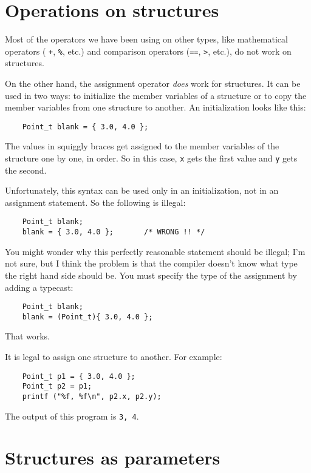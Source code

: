\section{Operations on structures}

Most of the operators we have been using on other types, like
mathematical operators ( {\tt +}, {\tt \%}, etc.) and comparison
operators ({\tt ==}, {\tt >}, etc.), do not work on structures.

On the other hand, the assignment operator {\em does} work for
structures.  It can be used in two ways: to initialize the member
variables of a structure or to copy the member variables from one
structure to another.  An initialization looks like this:

\begin{verbatim}
	Point_t blank = { 3.0, 4.0 };
\end{verbatim}
%
The values in squiggly braces get assigned to the member variables of
the structure one by one, in order.  So in this case, {\tt x}
gets the first value and {\tt y} gets the second.

Unfortunately, this syntax can be used only in an initialization,
not in an assignment statement.  So the following is illegal:

\begin{verbatim}
	Point_t blank;
	blank = { 3.0, 4.0 };       /* WRONG !! */
\end{verbatim}
%
You might wonder why this perfectly reasonable statement should
be illegal; I'm not sure, but I think the problem is that the compiler
doesn't know what type the right hand side should be.  You must specify
the type of the assignment by adding a typecast:

\begin{verbatim}
	Point_t blank;
	blank = (Point_t){ 3.0, 4.0 };
\end{verbatim}
%
That works.

It is legal to assign one structure to
another.  For example:

\begin{verbatim}
	Point_t p1 = { 3.0, 4.0 };
	Point_t p2 = p1;
	printf ("%f, %f\n", p2.x, p2.y);
\end{verbatim}
%
The output of this program is {\tt 3, 4}.

\section{Structures as parameters}
\label{Structures as parameters}

